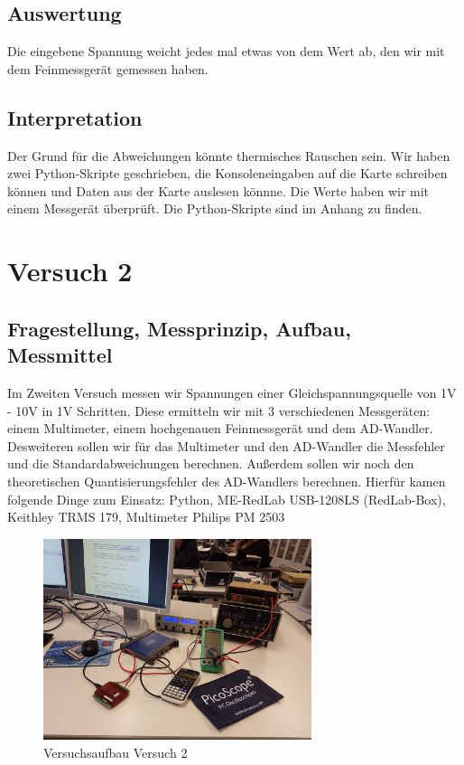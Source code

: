 \documentclass[12pt, oneside, a4paper, \docLanguage]{report}
\begin{document}
\section{Auswertung}
\label{chap:VERSUCH_1_AUSWERTUNG}
Die eingebene Spannung weicht jedes mal etwas von dem Wert ab, den wir mit dem Feinmessgerät gemessen haben.

\section{Interpretation}
\label{chap:VERSUCH_1_INTERPRETATION}
Der Grund für die Abweichungen könnte thermisches Rauschen sein.
Wir haben zwei Python-Skripte geschrieben, die Konsoleneingaben auf die Karte schreiben können und Daten aus der Karte auslesen könnne. Die Werte haben wir mit einem Messgerät überprüft.
Die Python-Skripte sind im Anhang zu finden.

%
%
\chapter{Versuch 2}
\label{chap:VERSUCH_2}

\section{Fragestellung, Messprinzip, Aufbau, Messmittel}
\label{chap:VERSUCH_2_FRAGESTELLUNG}
\begin{normalsize}
Im Zweiten Versuch messen wir Spannungen einer Gleichspannungsquelle von 1V - 10V in 1V Schritten. Diese ermitteln wir mit 3 verschiedenen Messgeräten: einem Multimeter, einem hochgenauen Feinmessgerät und dem AD-Wandler.
Desweiteren sollen wir für das Multimeter und den AD-Wandler die Messfehler und die Standardabweichungen berechnen. Außerdem sollen wir noch den theoretischen Quantisierungsfehler des AD-Wandlers berechnen. Hierfür kamen folgende Dinge zum Einsatz: Python, ME-RedLab USB-1208LS (RedLab-Box), Keithley TRMS 179, Multimeter Philips PM 2503
\begin{figure}[H]
	\centering
	\includegraphics[width=0.7\textwidth]{../Images/aufbauVersuch2.jpg}
	\caption{Versuchsaufbau Versuch 2}
\end{figure}
\end{normalsize}
\end{document}

